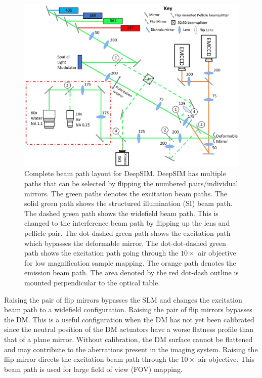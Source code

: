 \begin{figure}
	\centering
	\includegraphics[width=\textwidth]{images/DeepSIM_complete_beam_paths_upright.jpg}
	\caption[Complete beam path layout for DeepSIM.]{Complete beam path layout for DeepSIM. DeepSIM has multiple paths that can be selected by flipping the numbered pairs/individual mirrors. The green paths denotes the excitation beam paths. The solid green path shows the structured illumination (SI) beam path. The dashed green path shows the widefield beam path. This is changed to the interference beam path by flipping up the lens and pellicle pair. The dot-dashed green path shows the excitation path which bypasses the deformable mirror. The dot-dot-dashed green path shows the excitation path going through the $10\times$ air objective for low magnification sample mapping. The orange path denotes the emission beam path. The area denoted by the red dot-dash outline is mounted perpendicular to the optical table.}
	\label{fig:DeepSIM_complete_beam_paths}
\end{figure}

Raising the  pair of flip mirrors bypasses the SLM and changes the excitation beam path to a widefield configuration. Raising the  pair of flip mirrors bypasses the DM. This is a useful configuration when the DM has not yet been calibrated since the neutral position of the DM actuators have a worse flatness profile than that of a plane mirror. Without calibration, the DM surface cannot be flattened and may contribute to the aberrations present in the imaging system. Raising the  flip mirror directs the excitation beam path through the $10 \times$ air objective. This beam path is used for large field of view (FOV) mapping.

